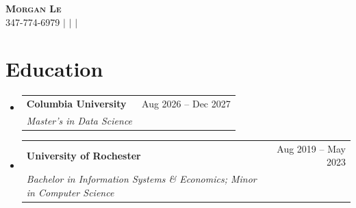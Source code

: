 \documentclass[a4paper,11pt]{article}
\makeatletter
\newcommand{\resumeSubheading}[4]{
  \vspace{-2pt}\item
    \begin{tabular*}{0.97\textwidth}[t]{l@{\extracolsep{\fill}}r}
      \textbf{#1} & #2 \\
      \textit{\small#3} & \textit{\small #4} \\
    \end{tabular*}\vspace{-7pt}
}
\newcommand{\resumeSubHeadingListStart}{\begin{itemize}[leftmargin=0.15in, label={}]}
\newcommand{\resumeSubHeadingListEnd}{\end{itemize}}
\makeatother
\begin{document}
\begin{center}
    \textbf{\Huge \scshape Morgan Le} \\ \vspace{1pt}
    \small 347-774-6979 $|$
    \href{mailto:ml5536@columbia.edu}{\underline{}} $|$
    \href{https://www.linkedin.com/in/morganhle/}{\underline{}} $|$
    \href{https://lhnminh.github.io/}{\underline{}}
\end{center}

\section{Education}
\resumeSubHeadingListStart
  \resumeSubheading
    {Columbia University}{Aug 2026 -- Dec 2027}
    {Master's in Data Science}{}
  \resumeSubheading
    {University of Rochester}{Aug 2019 -- May 2023}
    {Bachelor in Information Systems \& Economics; Minor in Computer Science}{}
\resumeSubHeadingListEnd
\end{document}
